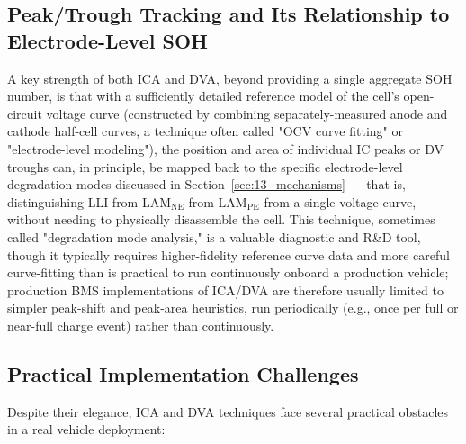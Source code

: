 \subsection{Peak/Trough Tracking and Its Relationship to Electrode-Level SOH}
\label{subsec:13_peak_tracking}

A key strength of both ICA and DVA, beyond providing a single aggregate SOH number, is that with a sufficiently detailed reference model of the cell's open-circuit voltage curve (constructed by combining separately-measured anode and cathode half-cell curves, a technique often called "OCV curve fitting" or "electrode-level modeling"), the position and area of individual IC peaks or DV troughs can, in principle, be mapped back to the specific electrode-level degradation modes discussed in Section~\ref{sec:13_mechanisms} — that is, distinguishing LLI from LAM$_{\text{NE}}$ from LAM$_{\text{PE}}$ from a single voltage curve, without needing to physically disassemble the cell. This technique, sometimes called "degradation mode analysis," is a valuable diagnostic and R\&D tool, though it typically requires higher-fidelity reference curve data and more careful curve-fitting than is practical to run continuously onboard a production vehicle; production BMS implementations of ICA/DVA are therefore usually limited to simpler peak-shift and peak-area heuristics, run periodically (e.g., once per full or near-full charge event) rather than continuously.

\subsection{Practical Implementation Challenges}
\label{subsec:13_ica_challenges}

Despite their elegance, ICA and DVA techniques face several practical obstacles in a real vehicle deployment:

